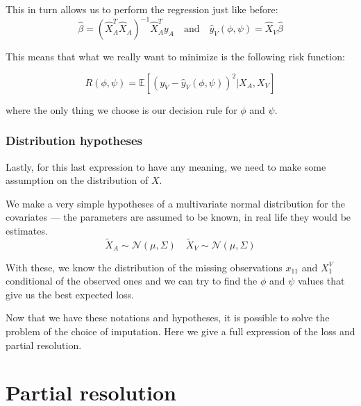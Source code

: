 \documentclass[12pt, a4paper]{memoir}
\begin{document}
This in turn allows us to perform the regression just like before:
$$
\hat{\beta} = (\hat{X}_A^T \hat{X}_A)^{-1} \hat{X}_A^T y_A 
\quad \mathrm{and} \quad
\hat{y}_V (\phi, \psi) = \hat{X}_V \hat{\beta} 
$$

This means that what we really want to minimize is the following risk function:

$$R(\phi, \psi) = \mathbb{E}[(y_V - \hat{y}_V(\phi,\psi))^2 \vert X_A, X_V]$$

where the only thing we choose is our decision rule for $\phi$ and $\psi$.
			\subsubsection{Distribution hypotheses}
Lastly, for this last expression to have any meaning, we need to make some assumption on the distribution of $X$.

We make a very simple hypotheses of a multivariate normal distribution for the covariates --- the parameters are assumed to be known, in real life they would be estimates.
$$
\tilde{X}_A \sim \mathcal{N}(\mu, \Sigma) \quad \tilde{X}_V \sim \mathcal{N}(\mu, \Sigma)
$$

With these, we know the distribution of the missing observations $x_{11}$ and $X_1^V$ conditional of the observed ones and we can try to find the $\phi$ and $\psi$ values that give us the best expected loss.

Now that we have these notations and hypotheses, it is possible to solve the problem of the choice of imputation. Here we give a full expression of the loss and partial resolution.

	\section{Partial resolution}
\end{document}
